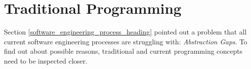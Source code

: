 %
%
%
%
%
%
%

\section{Traditional Programming}
\label{traditional_programming_heading}

Section \ref{software_engineering_process_heading} pointed out a problem that all
current software engineering processes are struggling with: \emph{Abstraction Gaps}.
To find out about possible reasons, traditional and current programming concepts
need to be inspected closer.



